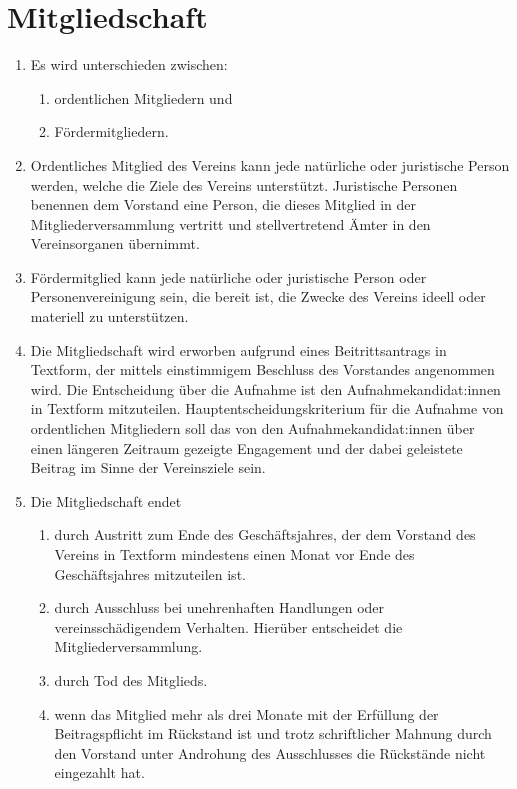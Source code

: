 \documentclass[12pt,paper=a4,ngerman]{scrreprt}
\begin{document}
	\section{Mitgliedschaft}
	\begin{enumerate}
		\item
			Es wird unterschieden zwischen:
			\begin{enumerate}
			    \item ordentlichen Mitgliedern und
			    \item Fördermitgliedern.
			\end{enumerate}
		\item
			Ordentliches Mitglied des Vereins kann jede natürliche oder juristische Person werden, welche die Ziele des Vereins unterstützt. Juristische Personen benennen dem Vorstand eine Person, die dieses Mitglied in der Mitgliederversammlung vertritt und stellvertretend Ämter in den Vereinsorganen übernimmt.
		\item
		    Fördermitglied kann jede natürliche oder juristische Person oder Personenvereinigung sein, die bereit ist, die Zwecke des Vereins ideell oder materiell zu unterstützen. 
	    \item
            Die Mitgliedschaft wird erworben aufgrund eines Beitrittsantrags in Textform, der mittels einstimmigem Beschluss des Vorstandes angenommen wird. Die Entscheidung über die Aufnahme ist den Aufnahmekandidat:innen in Textform mitzuteilen. Hauptentscheidungskriterium für die Aufnahme von ordentlichen Mitgliedern soll das von den Aufnahmekandidat:innen über einen längeren Zeitraum gezeigte Engagement und der dabei geleistete Beitrag im Sinne der Vereinsziele sein.
	    \item
            Die Mitgliedschaft endet
            \begin{enumerate}
                \item
                    durch Austritt zum Ende des Geschäftsjahres, der dem Vorstand des Vereins in Textform mindestens einen Monat vor Ende des Geschäftsjahres mitzuteilen ist.
                \item
	                \label{sec:mitgliedschaft:ende:unehrenhaft}
                    durch Ausschluss bei unehrenhaften Handlungen oder vereinsschädigendem Verhalten. Hierüber entscheidet die Mitgliederversammlung.
                \item
                    durch Tod des Mitglieds.
                \item
                    wenn das Mitglied mehr als drei Monate mit der Erfüllung der Beitragspflicht im Rückstand ist und trotz schriftlicher Mahnung durch den Vorstand unter Androhung des Ausschlusses die Rückstände nicht eingezahlt hat.
            \end{enumerate}
	\end{enumerate}
	
\end{document}
